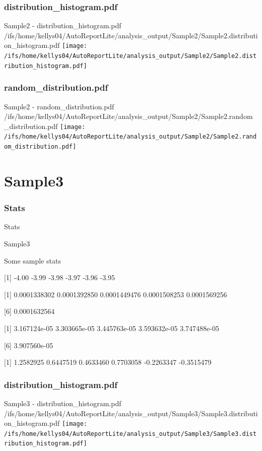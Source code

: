 \documentclass[8pt]{beamer}\usepackage[]{graphicx}\usepackage[]{color}
\begin{document}
\subsubsection{distribution\_histogram.pdf}
\begin{frame}{Sample2 - distribution\_histogram.pdf }
\scriptsize{/ifs/home/kellys04/AutoReportLite/analysis\_output/Sample2/Sample2.distribution\_histogram.pdf}
\texttt{[image: /ifs/home/kellys04/AutoReportLite/analysis\_output/Sample2/Sample2.distribution\_histogram.pdf]}
\end{frame}

\subsubsection{random\_distribution.pdf}
\begin{frame}{Sample2 - random\_distribution.pdf }
\scriptsize{/ifs/home/kellys04/AutoReportLite/analysis\_output/Sample2/Sample2.random\_distribution.pdf}
\texttt{[image: /ifs/home/kellys04/AutoReportLite/analysis\_output/Sample2/Sample2.random\_distribution.pdf]}
\end{frame}

\section{Sample3}
\subsubsection{Stats}
\begin{frame}{Stats }
\small{
Sample3 

Some sample stats

[1] -4.00 -3.99 -3.98 -3.97 -3.96 -3.95

[1] 0.0001338302 0.0001392850 0.0001449476 0.0001508253 0.0001569256

[6] 0.0001632564

[1] 3.167124e-05 3.303665e-05 3.445763e-05 3.593632e-05 3.747488e-05

[6] 3.907560e-05

[1]  1.2582925  0.6447519  0.4633460  0.7703058 -0.2263347 -0.3515479
}

\end{frame}

\subsubsection{distribution\_histogram.pdf}
\begin{frame}{Sample3 - distribution\_histogram.pdf }
\scriptsize{/ifs/home/kellys04/AutoReportLite/analysis\_output/Sample3/Sample3.distribution\_histogram.pdf}
\texttt{[image: /ifs/home/kellys04/AutoReportLite/analysis\_output/Sample3/Sample3.distribution\_histogram.pdf]}
\end{frame}
\end{document}
